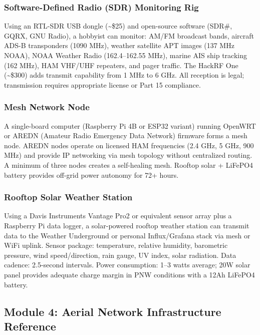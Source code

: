 \documentclass[11pt,letterpaper]{article}
\begin{document}
\subsubsection{Software-Defined Radio (SDR) Monitoring Rig}

Using an RTL-SDR USB dongle (\textasciitilde\$25) and open-source software (SDR\#, GQRX, GNU Radio), a hobbyist can monitor: AM/FM broadcast bands, aircraft ADS-B transponders (1090 MHz), weather satellite APT images (137 MHz NOAA), NOAA Weather Radio (162.4--162.55 MHz), marine AIS ship tracking (162 MHz), HAM VHF/UHF repeaters, and pager traffic. The HackRF One (\textasciitilde\$300) adds transmit capability from 1 MHz to 6 GHz. All reception is legal; transmission requires appropriate license or Part 15 compliance.

\subsubsection{Mesh Network Node}

A single-board computer (Raspberry Pi 4B or ESP32 variant) running OpenWRT or AREDN (Amateur Radio Emergency Data Network) firmware forms a mesh node. AREDN nodes operate on licensed HAM frequencies (2.4 GHz, 5 GHz, 900 MHz) and provide IP networking via mesh topology without centralized routing. A minimum of three nodes creates a self-healing mesh. Rooftop solar + LiFePO4 battery provides off-grid power autonomy for 72+ hours.

\subsubsection{Rooftop Solar Weather Station}

Using a Davis Instruments Vantage Pro2 or equivalent sensor array plus a Raspberry Pi data logger, a solar-powered rooftop weather station can transmit data to the Weather Underground or personal Influx/Grafana stack via mesh or WiFi uplink. Sensor package: temperature, relative humidity, barometric pressure, wind speed/direction, rain gauge, UV index, solar radiation. Data cadence: 2.5-second intervals. Power consumption: 1--3 watts average; 20W solar panel provides adequate charge margin in PNW conditions with a 12Ah LiFePO4 battery.

\subsection{Module 4: Aerial Network Infrastructure Reference}
\end{document}
